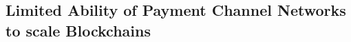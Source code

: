 \documentclass[10pt,twocolumn]{article}
\begin{document}
\subsection{Limited Ability of Payment Channel Networks to scale Blockchains}


\end{document}
